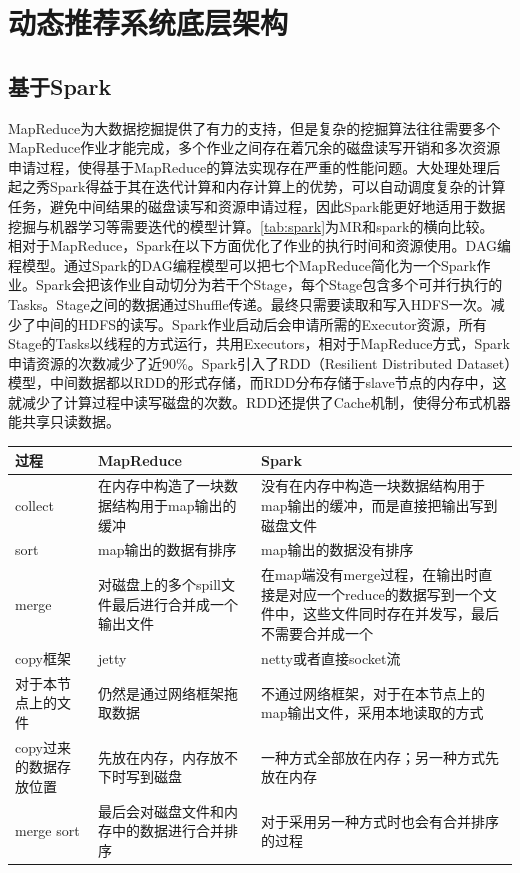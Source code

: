   \section{动态推荐系统底层架构}
    \subsection{基于Spark}
    MapReduce为大数据挖掘提供了有力的支持，但是复杂的挖掘算法往往需要多个MapReduce作业才能完成，多个作业之间存在着冗余的磁盘读写开销和多次资源申请过程，使得基于MapReduce的算法实现存在严重的性能问题。大处理处理后起之秀Spark得益于其在迭代计算和内存计算上的优势，可以自动调度复杂的计算任务，避免中间结果的磁盘读写和资源申请过程，因此Spark能更好地适用于数据挖掘与机器学习等需要迭代的模型计算。\autoref{tab:spark}为MR和spark的横向比较。
    相对于MapReduce，Spark在以下方面优化了作业的执行时间和资源使用。DAG编程模型。通过Spark的DAG编程模型可以把七个MapReduce简化为一个Spark作业。Spark会把该作业自动切分为若干个Stage，每个Stage包含多个可并行执行的Tasks。Stage之间的数据通过Shuffle传递。最终只需要读取和写入HDFS一次。减少了中间的HDFS的读写。Spark作业启动后会申请所需的Executor资源，所有Stage的Tasks以线程的方式运行，共用Executors，相对于MapReduce方式，Spark申请资源的次数减少了近90\%。Spark引入了RDD（Resilient Distributed Dataset）模型，中间数据都以RDD的形式存储，而RDD分布存储于slave节点的内存中，这就减少了计算过程中读写磁盘的次数。RDD还提供了Cache机制，使得分布式机器能共享只读数据。
    
    \begin{table}[htp]
    \centering
    \label{tab:spark}
    \begin{tabular}{ |p{3cm}|p{5cm}|p{5cm}| } \hline
     过程 & MapReduce & Spark \\ \hline
     collect & 在内存中构造了一块数据结构用于map输出的缓冲 & 没有在内存中构造一块数据结构用于map输出的缓冲，而是直接把输出写到磁盘文件 \\ \hline
     sort & map输出的数据有排序 & map输出的数据没有排序 \\ \hline
     merge & 对磁盘上的多个spill文件最后进行合并成一个输出文件 & 在map端没有merge过程，在输出时直接是对应一个reduce的数据写到一个文件中，这些文件同时存在并发写，最后不需要合并成一个 \\ \hline
     copy框架 & jetty & netty或者直接socket流 \\ \hline
     对于本节点上的文件 & 仍然是通过网络框架拖取数据 & 不通过网络框架，对于在本节点上的map输出文件，采用本地读取的方式\\ \hline
     copy过来的数据存放位置 & 先放在内存，内存放不下时写到磁盘 & 一种方式全部放在内存；另一种方式先放在内存\\ \hline
     merge sort & 最后会对磁盘文件和内存中的数据进行合并排序 & 对于采用另一种方式时也会有合并排序的过程\\ \hline
    \end{tabular}
    \end{table}

